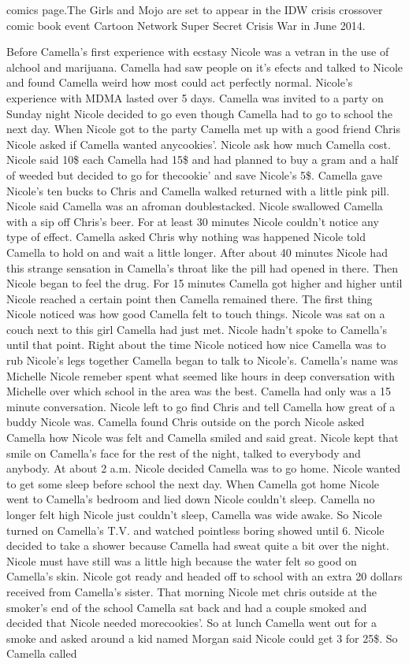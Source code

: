 \documentclass[12pt]{book}
\begin{document}
comics page.The Girls and Mojo are set to appear in the IDW crisis crossover comic book event Cartoon Network Super Secret Crisis War in June 2014.



Before Camella's first experience with ecstasy Nicole was a vetran in the use of alchool and marijuana. Camella had saw people on it's efects and talked to Nicole and found Camella weird how most could act perfectly normal. Nicole's experience with MDMA lasted over 5 days. Camella was invited to a party on Sunday night Nicole decided to go even though Camella had to go to school the next day. When Nicole got to the party Camella met up with a good friend Chris Nicole asked if Camella wanted anycookies'. Nicole ask how much Camella cost. Nicole said 10\$ each Camella had 15\$ and had planned to buy a gram and a half of weeded but decided to go for thecookie' and save Nicole's 5\$. Camella gave Nicole's ten bucks to Chris and Camella walked returned with a little pink pill. Nicole said Camella was an afroman doublestacked. Nicole swallowed Camella with a sip off Chris's beer. For at least 30 minutes Nicole couldn't notice any type of effect. Camella asked Chris why nothing was happened Nicole told Camella to hold on and wait a little longer. After about 40 minutes Nicole had this strange sensation in Camella's throat like the pill had opened in there. Then Nicole began to feel the drug. For 15 minutes Camella got higher and higher until Nicole reached a certain point then Camella remained there. The first thing Nicole noticed was how good Camella felt to touch things. Nicole was sat on a couch next to this girl Camella had just met. Nicole hadn't spoke to Camella's until that point. Right about the time Nicole noticed how nice Camella was to rub Nicole's legs together Camella began to talk to Nicole's. Camella's name was Michelle Nicole remeber spent what seemed like hours in deep conversation with Michelle over which school in the area was the best. Camella had only was a 15 minute conversation. Nicole left to go find Chris and tell Camella how great of a buddy Nicole was. Camella found Chris outside on the porch Nicole asked Camella how Nicole was felt and Camella smiled and said great. Nicole kept that smile on Camella's face for the rest of the night, talked to everybody and anybody. At about 2 a.m. Nicole decided Camella was to go home. Nicole wanted to get some sleep before school the next day. When Camella got home Nicole went to Camella's bedroom and lied down Nicole couldn't sleep. Camella no longer felt high Nicole just couldn't sleep, Camella was wide awake. So Nicole turned on Camella's T.V. and watched pointless boring showed until 6. Nicole decided to take a shower because Camella had sweat quite a bit over the night. Nicole must have still was a little high because the water felt so good on Camella's skin. Nicole got ready and headed off to school with an extra 20 dollars received from Camella's sister. That morning Nicole met chris outside at the smoker's end of the school Camella sat back and had a couple smoked and decided that Nicole needed morecookies'. So at lunch Camella went out for a smoke and asked around a kid named Morgan said Nicole could get 3 for 25\$. So Camella called 
\end{document}
